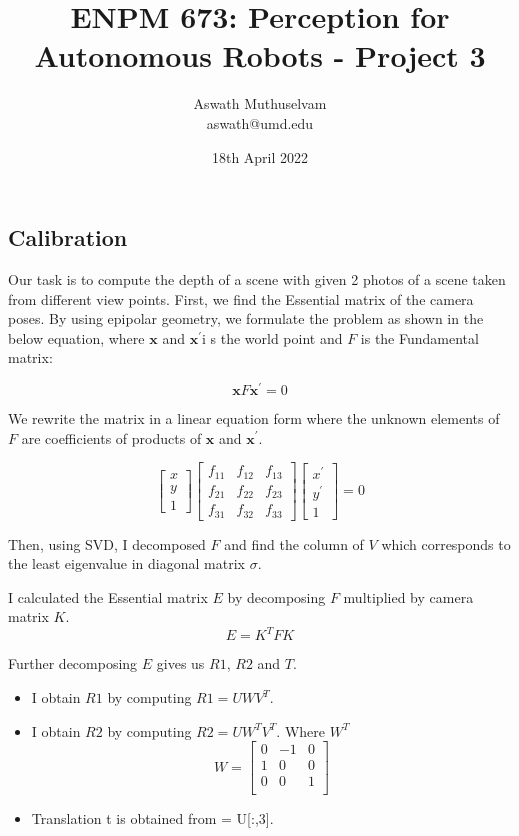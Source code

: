 \documentclass[a4paper, 10pt]{article}
\title{ENPM 673: Perception for Autonomous Robots - Project 3}
\author{Aswath Muthuselvam \\ aswath@umd.edu}
\date{18th April 2022}
\begin{document}
	\maketitle
	
	
	
	\begin{multicols}{2}
		
		\section{Calibration}
		
		Our task is to compute the depth of a scene with given 2 photos of a scene taken from different view points. First, we find the Essential matrix of the camera poses. By using epipolar geometry, we formulate the problem as shown in the below equation, where $\mathbf{x}$ and $\mathbf{x^{'}}$i s the world point and $F$ is the Fundamental matrix: 
		
		\[
		\mathbf{x}F\mathbf{x^{'}}=0
		\]

		We rewrite the matrix in a linear equation form where the unknown elements of $F$ are coefficients of products of $\mathbf{x}$ and $\mathbf{x^{'}}$. 
		
		\[
		\begin{bmatrix}
		x \\
		y \\
		1
		\end{bmatrix}
		\begin{bmatrix}
		f_{11} & f_{12} & f_{13}\\
		f_{21} & f_{22} & f_{23}\\
		f_{31} & f_{32} & f_{33}
		\end{bmatrix}
		\begin{bmatrix}
		x^{'} \\
		y^{'} \\
		1
		\end{bmatrix}
		=0
		\]		
		
		Then, using SVD, I decomposed $F$ and find the column of $V$ which corresponds to the least eigenvalue in diagonal matrix $\sigma$.   
		
		I calculated the Essential matrix $E$ by decomposing $F$ multiplied by camera matrix $K$. 
		\[
		E = K^{T}FK
		\]
		
		Further decomposing $E$ gives us $R1$, $R2$ and $T$.
		
		\begin{itemize}
			\item I obtain $R1$ by computing $R1=UWV^{T}$.
			\item I obtain $R2$ by computing $R2=UW^{T}V^{T}$. Where $W^{T}$
				\[
				W=\begin{bmatrix}
				0 & -1 & 0 \\
				1 & 0 & 0 \\
				0 & 0 & 1 \\
				\end{bmatrix}
				\]
			\item Translation t is obtained from = U[:,3].
		\end{itemize}
		

\end{multicols}
\end{document}
